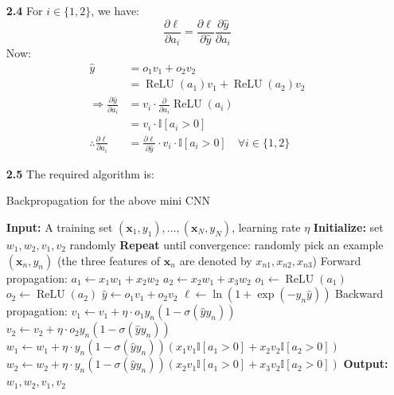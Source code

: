 \documentclass{article}
\newcommand{\mbi}[1]{\boldsymbol{#1}}
\newcommand{\IndentState}{\State \hspace{1em}}
\newcommand{\DIndentState}{\State \hspace{2em}}
\DeclareMathOperator{\relu}{ReLU}
\begin{document}
\begin{itemize}
    \item[\textbf{2.4}] For $i \in \{1, 2\}$, we have:
    \[ \frac{\partial\ell}{\partial a_i} = \frac{\partial\ell}{\partial\hat{y}} \frac{\partial\hat{y}}{\partial a_i} \]
    Now:
    \begin{align*}
      \hat{y} &= o_1v_1 + o_2v_2 \\
      &= \relu(a_1)v_1 + \relu(a_2)v_2 \\
      \Rightarrow \frac{\partial\hat{y}}{\partial a_i} &= v_i \cdot \frac{\partial}{\partial a_i} \relu(a_i) \\
      &= v_i \cdot \mathbb{I}[a_i > 0] \\
      \therefore \frac{\partial\ell}{\partial a_i} &= \frac{\partial\ell}{\partial\hat{y}} \cdot v_i \cdot \mathbb{I}[a_i > 0] \quad \forall i \in \{1, 2\}
    \end{align*}

    \item[\textbf{2.5}] The required algorithm is:
    \begin{algorithm}
      \caption{Backpropagation for the above mini CNN}
      \begin{algorithmic}[1]
        \State \textbf{Input:} A training set $(\mbi{x}_1, y_1), \dots, (\mbi{x}_N, y_N)$, learning rate $\eta$
        \State \textbf{Initialize:} set $w_1, w_2, v_1, v_2$ randomly
        \State \textbf{Repeat} until convergence:
        \IndentState randomly pick an example $(\mbi{x}_n, y_n)$ (the three features of $\mbi{x}_n$ are denoted by $x_{n1}, x_{n2}, x_{n3}$)
        \IndentState Forward propagation:
        \DIndentState $a_1 \gets x_1w_1 + x_2w_2$
        \DIndentState $a_2 \gets x_2w_1 + x_3w_2$
        \DIndentState $o_1 \gets \relu(a_1)$
        \DIndentState $o_2 \gets \relu(a_2)$
        \DIndentState $\hat{y} \gets o_1v_1 + o_2v_2$
        \DIndentState $\ell \gets \ln(1 + \exp(-y_n\hat{y}))$
        \IndentState Backward propagation:
        \DIndentState $v_1 \gets v_1 + \eta \cdot o_1 y_n (1 - \sigma(\hat{y}y_n))$
        \DIndentState $v_2 \gets v_2 + \eta \cdot o_2 y_n (1 - \sigma(\hat{y}y_n))$
        \DIndentState $w_1 \gets w_1 + \eta \cdot y_n (1-\sigma(\hat{y}y_n)) (x_1v_1\mathbb{I}[a_1 > 0] + x_2v_2\mathbb{I}[a_2 > 0])$
        \DIndentState $w_2 \gets w_2 + \eta \cdot y_n (1-\sigma(\hat{y}y_n)) (x_2v_1\mathbb{I}[a_1 > 0] + x_3v_2\mathbb{I}[a_2 > 0])$
        \State \textbf{Output:} $w_1, w_2, v_1, v_2$
      \end{algorithmic}
    \end{algorithm}
  \end{itemize}
  
\end{document}
